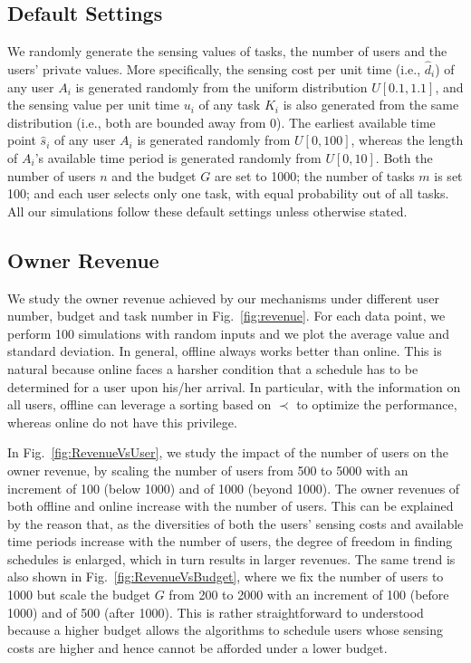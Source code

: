 \documentclass[10pt,journal,compsoc]{IEEEtran}
\begin{document}
  \subsection{Default Settings} \label{sec:simgeneral}
We randomly generate the sensing values of tasks, the number of users and the users' private values. More specifically, the sensing cost per unit time (i.e., $\hat{d}_i$) of any user $A_i$ is generated randomly from the uniform distribution $U[0.1,1.1]$, and the sensing value per unit time $u_i$ of any task $K_i$ is also generated from the same distribution (i.e., both are bounded away from 0). The earliest available time point $\hat{s}_i$ of any user $A_i$ is generated randomly from $U[0,100]$, whereas the length of $A_i$'s available time period is generated randomly from $U[0,10]$. Both the number of users $n$ and the budget $G$ are set to 1000; the number of tasks $m$ is set 100; and each user selects only one task, with equal probability out of all tasks. All our simulations follow these default settings unless otherwise stated.

  \subsection{Owner Revenue}
We study the owner revenue achieved by our mechanisms under different user number, budget and task number in Fig.~\ref{fig:revenue}. For each data point, we perform 100 simulations with random inputs and we plot the average value and standard deviation. In general, \textsf{offline} always works better than \textsf{online}. This is natural because \textsf{online} faces a harsher condition that a schedule has to be determined for a user upon his/her arrival. In particular, with the information on all users, \textsf{offline} can leverage a sorting based on $\prec$ to optimize the performance, whereas \textsf{online} do not have this privilege.

    In Fig.~\ref{fig:RevenueVsUser}, we study the impact of the number of users on the owner revenue, by scaling the number of users from 500 to 5000 with an increment of 100 (below 1000) and of 1000 (beyond 1000). The owner revenues of both \textsf{offline} and \textsf{online} increase with the number of users. This can be explained by the reason that, as the diversities of both the users' sensing costs and available time periods increase with the number of users, the degree of freedom in finding schedules is enlarged, which in turn results in larger revenues. The same trend is also shown in Fig.~\ref{fig:RevenueVsBudget}, where we fix the number of users to 1000 but scale the budget $G$ from 200 to 2000 with an increment of 100 (before 1000) and of 500 (after 1000). This is rather straightforward to understood because a higher budget allows the algorithms to schedule users whose sensing costs are higher and hence cannot be afforded under a lower budget.
\end{document}
